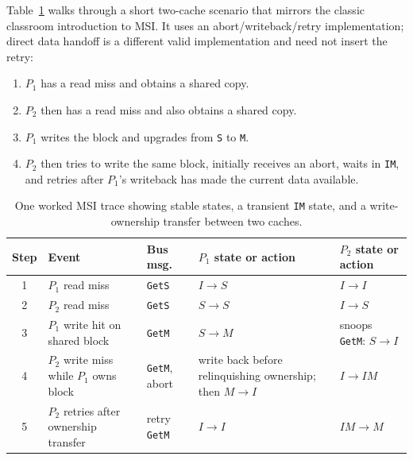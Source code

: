 Table~\ref{tab:mp-msi-trace} walks through a short two-cache scenario that mirrors the classic classroom introduction to MSI.
It uses an abort/writeback/retry implementation; direct data handoff is a different valid implementation and need not insert the retry:
\begin{enumerate}
    \item $P_1$ has a read miss and obtains a shared copy.
    \item $P_2$ then has a read miss and also obtains a shared copy.
    \item $P_1$ writes the block and upgrades from \texttt{S} to \texttt{M}.
    \item $P_2$ then tries to write the same block, initially receives an abort, waits in \texttt{IM}, and retries after $P_1$'s writeback has made the current data available.
\end{enumerate}
\begin{table}[t]
    \centering
    \footnotesize
    \renewcommand{\arraystretch}{1.15}
    \begin{tabular}{|c|>{\raggedright\arraybackslash}p{1.15in}|>{\raggedright\arraybackslash}p{0.95in}|>{\raggedright\arraybackslash}p{1.25in}|>{\raggedright\arraybackslash}p{1.65in}|}
        \hline
        Step & Event                                   & Bus msg.\             & $P_1$ state or action                                                          & $P_2$ state or action                  \\
        \hline
        1    & $P_1$ read miss                         & \texttt{GetS}        & $I\rightarrow S$                                                               & $I\rightarrow I$                       \\
        \hline
        2    & $P_2$ read miss                         & \texttt{GetS}        & $S\rightarrow S$                                                               & $I\rightarrow S$                       \\
        \hline
        3    & $P_1$ write hit on shared block         & \texttt{GetM}        & $S\rightarrow M$                                                               & snoops \texttt{GetM}: $S\rightarrow I$ \\
        \hline
        4    & $P_2$ write miss while $P_1$ owns block & \texttt{GetM}, abort & write back before relinquishing ownership; then $M\rightarrow I$ & $I\rightarrow IM$ \\
        \hline
        5    & $P_2$ retries after ownership transfer  & retry \texttt{GetM}  & $I\rightarrow I$                                                               & $IM\rightarrow M$                      \\
        \hline
    \end{tabular}
    \caption{One worked MSI trace showing stable states, a transient \texttt{IM} state, and a write-ownership transfer between two caches.}
    \label{tab:mp-msi-trace}
\end{table}

